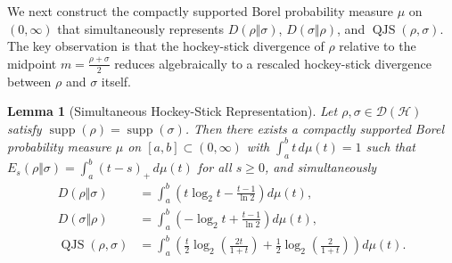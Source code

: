 \documentclass[10pt,a4paper]{article}
\numberwithin{equation}{section}
\theoremstyle{plain}
\newtheorem{lemma}[theorem]{Lemma}
\theoremstyle{definition}
\theoremstyle{remark}
\DeclareMathOperator{\supp}{supp}
\DeclareMathOperator{\QJS}{QJS}
\newcommand{\cH}{\mathcal{H}}
\newcommand{\cD}{\mathcal{D}}
\begin{document}
We next construct the compactly supported Borel probability measure $\mu$ on $(0,\infty)$ that simultaneously represents $D(\rho\Vert\sigma)$, $D(\sigma\Vert\rho)$, and $\QJS(\rho, \sigma)$. The key observation is that the hockey-stick divergence of $\rho$ relative to the midpoint $m = \frac{\rho+\sigma}{2}$ reduces algebraically to a rescaled hockey-stick divergence between $\rho$ and $\sigma$ itself.

\begin{lemma}[Simultaneous Hockey-Stick Representation]\label{lem:hockey-stick-measure}
Let $\rho, \sigma \in \cD(\cH)$ satisfy $\supp(\rho) = \supp(\sigma)$. Then there exists a compactly supported Borel probability measure $\mu$ on $[a, b] \subset (0, \infty)$ with $\int_a^b t\, d\mu(t) = 1$ such that $E_s(\rho \Vert \sigma) = \int_a^b (t - s)_+\, d\mu(t)$ for all $s \ge 0$, and simultaneously
\begin{align}
D(\rho \Vert \sigma) &= \int_a^b \left(t\log_2 t - \frac{t-1}{\ln 2}\right) d\mu(t), \label{eq:D-rho-sigma-rep}\\
D(\sigma \Vert \rho) &= \int_a^b \left(-\log_2 t + \frac{t-1}{\ln 2}\right) d\mu(t), \label{eq:D-sigma-rho-rep}\\
\QJS(\rho, \sigma) &= \int_a^b \left(\frac{t}{2}\log_2\!\left(\frac{2t}{1+t}\right) + \frac{1}{2}\log_2\!\left(\frac{2}{1+t}\right)\right) d\mu(t). \label{eq:qjs-rep}
\end{align}
\end{lemma}
\end{document}
